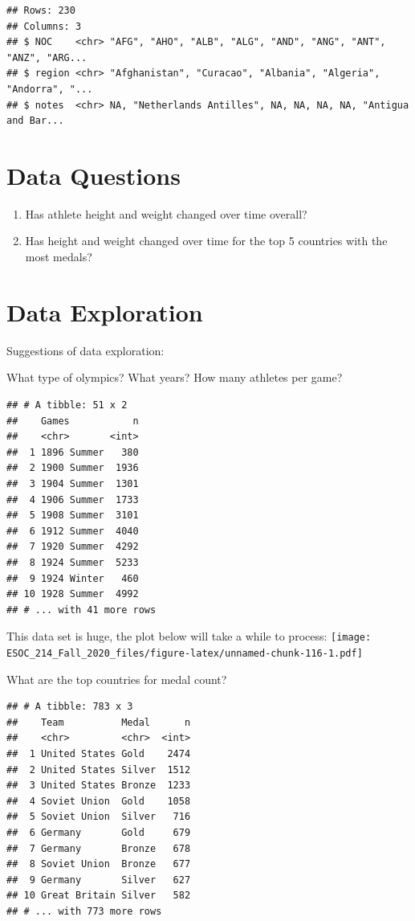 \documentclass[
]{book}
\begin{document}
\begin{verbatim}
## Rows: 230
## Columns: 3
## $ NOC    <chr> "AFG", "AHO", "ALB", "ALG", "AND", "ANG", "ANT", "ANZ", "ARG...
## $ region <chr> "Afghanistan", "Curacao", "Albania", "Algeria", "Andorra", "...
## $ notes  <chr> NA, "Netherlands Antilles", NA, NA, NA, NA, "Antigua and Bar...
\end{verbatim}

\hypertarget{data-questions}{%
\section{Data Questions}\label{data-questions}}

\begin{enumerate}
\def\labelenumi{\arabic{enumi})}
\item
  Has athlete height and weight changed over time overall?
\item
  Has height and weight changed over time for the top 5 countries with the most medals?
\end{enumerate}

\hypertarget{data-exploration}{%
\section{Data Exploration}\label{data-exploration}}

Suggestions of data exploration:

What type of olympics? What years? How many athletes per game?

\begin{verbatim}
## # A tibble: 51 x 2
##    Games           n
##    <chr>       <int>
##  1 1896 Summer   380
##  2 1900 Summer  1936
##  3 1904 Summer  1301
##  4 1906 Summer  1733
##  5 1908 Summer  3101
##  6 1912 Summer  4040
##  7 1920 Summer  4292
##  8 1924 Summer  5233
##  9 1924 Winter   460
## 10 1928 Summer  4992
## # ... with 41 more rows
\end{verbatim}

This data set is huge, the plot below will take a while to process:
\texttt{[image: ESOC\_214\_Fall\_2020\_files/figure-latex/unnamed-chunk-116-1.pdf]}

What are the top countries for medal count?

\begin{verbatim}
## # A tibble: 783 x 3
##    Team          Medal      n
##    <chr>         <chr>  <int>
##  1 United States Gold    2474
##  2 United States Silver  1512
##  3 United States Bronze  1233
##  4 Soviet Union  Gold    1058
##  5 Soviet Union  Silver   716
##  6 Germany       Gold     679
##  7 Germany       Bronze   678
##  8 Soviet Union  Bronze   677
##  9 Germany       Silver   627
## 10 Great Britain Silver   582
## # ... with 773 more rows
\end{verbatim}
\end{document}
